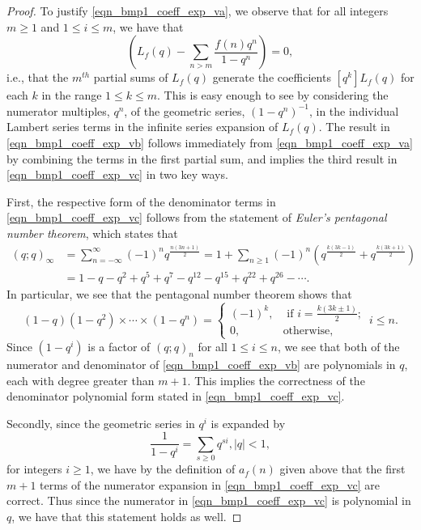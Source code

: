 \documentclass[12pt,reqno,a4letter]{article}
\numberwithin{figure}{section}
\numberwithin{table}{section}
\numberwithin{equation}{section}
\let\citep\cite
\theoremstyle{plain}
\numberwithin{theorem}{section}
\theoremstyle{definition}
\begin{document}
\begin{proof} 
To justify \eqref{eqn_bmp1_coeff_exp_va}, we observe that for all integers 
$m \geq 1$ and $1 \leq i \leq m$, we have that 
\begin{equation*} 
[q^i] \left(L_f(q) - \sum_{n > m} \frac{f(n) q^n}{1-q^n}\right) = 0, 
\end{equation*} 
i.e., that the $m^{th}$ partial sums of $L_f(q)$ generate the coefficients 
$[q^k] L_f(q)$ for each $k$ in the range $1 \leq k \leq m$. 
This is easy enough to see by considering the numerator multiples, $q^n$, of the 
geometric series, $(1-q^n)^{-1}$, in the individual Lambert series terms in the infinite 
series expansion of $L_f(q)$. 
The result in \eqref{eqn_bmp1_coeff_exp_vb} follows immediately from 
\eqref{eqn_bmp1_coeff_exp_va} by combining the terms in the first partial sum, and 
implies the third result in \eqref{eqn_bmp1_coeff_exp_vc} in two key ways. 

First, the respective form of the denominator terms in 
\eqref{eqn_bmp1_coeff_exp_vc} follows from the statement of 
\emph{Euler's pentagonal number theorem}, which states that 
\citep[\S 19.9, Thm.\ 353]{HARDYWRIGHT} 
\begin{align*} 
(q; q)_{\infty} & = \sum_{n=-\infty}^{\infty} (-1)^n q^{\frac{n(3n+1)}{2}} = 
     1 + \sum_{n \geq 1} (-1)^n \left(q^{\frac{k(3k-1)}{2}} + q^{\frac{k(3k+1)}{2}}\right) \\ 
     & = 
     1 - q - q^2 + q^5+q^7-q^{12}-q^{15}+q^{22}+q^{26} - \cdots. 
\end{align*} 
In particular, we see that the pentagonal number theorem shows that 
\begin{equation*} 
[q^i] (1-q)(1-q^2) \times \cdots \times (1-q^n) = 
     \begin{cases} 
     (-1)^k, & \text{ if $i = \frac{k(3k\pm 1)}{2}$; } \\ 
     0, & \text{otherwise, } 
     \end{cases} 
     i \leq n.
\end{equation*} 
Since $(1-q^i)$ is a factor of $(q; q)_{n}$ for all $1 \leq i \leq n$, 
we see that both of the numerator and denominator of 
\eqref{eqn_bmp1_coeff_exp_vb} are polynomials in $q$, 
each with degree greater than $m+1$. 
This implies the correctness of the 
denominator polynomial form stated in \eqref{eqn_bmp1_coeff_exp_vc}. 

Secondly, since the geometric series in $q^i$ is expanded by 
\begin{equation*} 
\frac{1}{1-q^i} = \sum_{s \geq 0} q^{si}, |q| < 1, 
\end{equation*} 
for integers $i \geq 1$, we have by the definition of $a_f(n)$ given above 
that the first $m+1$ terms of the 
numerator expansion in \eqref{eqn_bmp1_coeff_exp_vc} are correct. 
Thus since the numerator in \eqref{eqn_bmp1_coeff_exp_vc} is polynomial in $q$, 
we have that this statement holds as well. 
\end{proof} 
\end{document}
